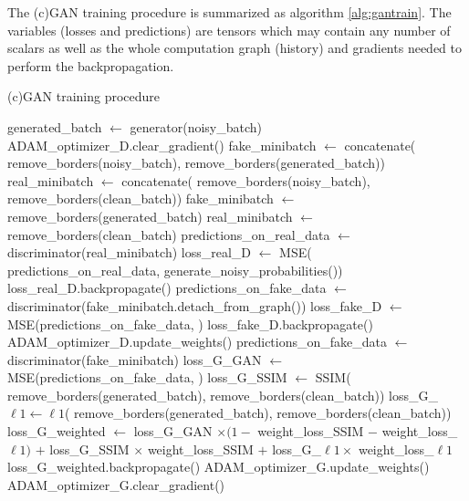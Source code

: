 The (c)GAN training procedure is summarized as algorithm \ref{alg:gantrain}. The variables (losses and predictions) are tensors which may contain any number of scalars as well as the whole computation graph (history) and gradients needed to perform the backpropagation.


\begin{algorithm}
\caption{(c)GAN training procedure}\label{alg:gantrain}
\begin{algorithmic}[1]
\STATE generated\_batch $\leftarrow$ generator(noisy\_batch) 
\STATE {}
\STATE {}
\STATE ADAM\_optimizer\_D.clear\_gradient()
\STATE fake\_minibatch $\leftarrow$ concatenate(
\STATE \quad remove\_borders(noisy\_batch),
\STATE \quad remove\_borders(generated\_batch))
\STATE real\_minibatch $\leftarrow$ concatenate(
\STATE \quad remove\_borders(noisy\_batch),
\STATE \quad remove\_borders(clean\_batch))
\ELSE
\STATE fake\_minibatch $\leftarrow$ remove\_borders(generated\_batch)
\STATE real\_minibatch $\leftarrow$ remove\_borders(clean\_batch)
\ENDIF
\STATE predictions\_on\_real\_data $\leftarrow$ discriminator(real\_minibatch)
\STATE loss\_real\_D $\leftarrow$ \ac{MSE}(
\STATE \quad predictions\_on\_real\_data,
\STATE \quad generate\_noisy\_probabilities(\TRUE))
\STATE loss\_real\_D.backpropagate()
\STATE predictions\_on\_fake\_data $\leftarrow$
\STATE \quad discriminator(fake\_minibatch.detach\_from\_graph())
\STATE loss\_fake\_D $\leftarrow$ \ac{MSE}(predictions\_on\_fake\_data, \FALSE)
\STATE loss\_fake\_D.backpropagate()
\STATE ADAM\_optimizer\_D.update\_weights()
\ENDIF
\STATE {}
\STATE {}
\STATE predictions\_on\_fake\_data $\leftarrow$ discriminator(fake\_minibatch)
\STATE loss\_G\_GAN $\leftarrow$ \ac{MSE}(predictions\_on\_fake\_data, \TRUE)
\STATE loss\_G\_SSIM $\leftarrow$ \ac{SSIM}(
\STATE \quad remove\_borders(generated\_batch),
\STATE \quad remove\_borders(clean\_batch))
\STATE loss\_G\_$\ell 1\leftarrow \ell 1$(
\STATE \quad remove\_borders(generated\_batch),
\STATE \quad remove\_borders(clean\_batch))
\STATE loss\_G\_weighted $\leftarrow$ 
\STATE \quad loss\_G\_GAN $\times (1- $ weight\_loss\_SSIM $-$ weight\_loss\_$\ell 1)$
\STATE \quad $+$ loss\_G\_SSIM $\times$ weight\_loss\_SSIM
\STATE \quad $+$ loss\_G\_$\ell 1 \times$ weight\_loss\_$\ell 1$
\STATE loss\_G\_weighted.backpropagate()
\STATE ADAM\_optimizer\_G.update\_weights()
\STATE ADAM\_optimizer\_G.clear\_gradient()
\ENDIF
\ENDFOR
\end{algorithmic}
\end{algorithm}
